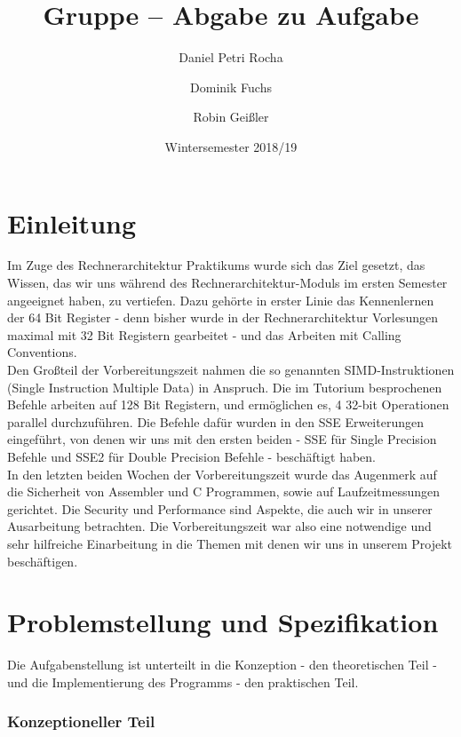 \documentclass[course=erap]{aspdoc}
\author{Daniel Petri Rocha \and Dominik Fuchs \and Robin Geißler}
\date{Wintersemester 2018/19}
\title{Gruppe \theGroup{} -- Abgabe zu Aufgabe \theNumber}
\begin{document}
\maketitle

\tableofcontents







\section{Einleitung}

Im Zuge des Rechnerarchitektur Praktikums wurde sich das Ziel gesetzt, das Wissen, das wir uns während des Rechnerarchitektur-Moduls im ersten Semester angeeignet haben, zu vertiefen. Dazu gehörte in erster Linie das Kennenlernen der 64 Bit Register - denn bisher wurde in der Rechnerarchitektur Vorlesungen maximal mit 32 Bit Registern gearbeitet - und das Arbeiten mit Calling Conventions.\\ Den Großteil der Vorbereitungszeit nahmen die so genannten SIMD-Instruktionen (Single Instruction Multiple Data) in Anspruch. Die im Tutorium besprochenen Befehle arbeiten auf 128 Bit Registern, und ermöglichen es, 4 32-bit Operationen parallel durchzuführen. Die Befehle dafür wurden in den SSE Erweiterungen eingeführt, von denen wir uns mit den ersten beiden - SSE für Single Precision Befehle und SSE2 für Double Precision Befehle - beschäftigt haben.\\
In den letzten beiden Wochen der Vorbereitungszeit wurde das Augenmerk auf die Sicherheit von Assembler und C Programmen, sowie auf Laufzeitmessungen gerichtet. Die Security und Performance sind Aspekte, die auch wir in unserer Ausarbeitung betrachten. Die Vorbereitungszeit war also eine notwendige und sehr hilfreiche Einarbeitung in die Themen mit denen wir uns in unserem Projekt beschäftigen.


\section{Problemstellung und Spezifikation}

Die Aufgabenstellung ist unterteilt in die Konzeption - den theoretischen Teil - und die Implementierung des Programms - den praktischen Teil. 

\subsubsection{Konzeptioneller Teil}
\end{document}

